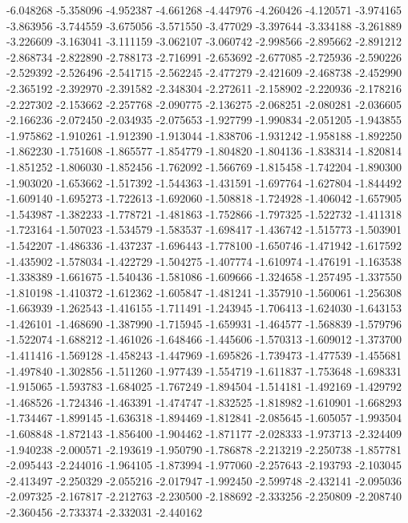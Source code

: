 -6.048268
-5.358096
-4.952387
-4.661268
-4.447976
-4.260426
-4.120571
-3.974165
-3.863956
-3.744559
-3.675056
-3.571550
-3.477029
-3.397644
-3.334188
-3.261889
-3.226609
-3.163041
-3.111159
-3.062107
-3.060742
-2.998566
-2.895662
-2.891212
-2.868734
-2.822890
-2.788173
-2.716991
-2.653692
-2.677085
-2.725936
-2.590226
-2.529392
-2.526496
-2.541715
-2.562245
-2.477279
-2.421609
-2.468738
-2.452990
-2.365192
-2.392970
-2.391582
-2.348304
-2.272611
-2.158902
-2.220936
-2.178216
-2.227302
-2.153662
-2.257768
-2.090775
-2.136275
-2.068251
-2.080281
-2.036605
-2.166236
-2.072450
-2.034935
-2.075653
-1.927799
-1.990834
-2.051205
-1.943855
-1.975862
-1.910261
-1.912390
-1.913044
-1.838706
-1.931242
-1.958188
-1.892250
-1.862230
-1.751608
-1.865577
-1.854779
-1.804820
-1.804136
-1.838314
-1.820814
-1.851252
-1.806030
-1.852456
-1.762092
-1.566769
-1.815458
-1.742204
-1.890300
-1.903020
-1.653662
-1.517392
-1.544363
-1.431591
-1.697764
-1.627804
-1.844492
-1.609140
-1.695273
-1.722613
-1.692060
-1.508818
-1.724928
-1.406042
-1.657905
-1.543987
-1.382233
-1.778721
-1.481863
-1.752866
-1.797325
-1.522732
-1.411318
-1.723164
-1.507023
-1.534579
-1.583537
-1.698417
-1.436742
-1.515773
-1.503901
-1.542207
-1.486336
-1.437237
-1.696443
-1.778100
-1.650746
-1.471942
-1.617592
-1.435902
-1.578034
-1.422729
-1.504275
-1.407774
-1.610974
-1.476191
-1.163538
-1.338389
-1.661675
-1.540436
-1.581086
-1.609666
-1.324658
-1.257495
-1.337550
-1.810198
-1.410372
-1.612362
-1.605847
-1.481241
-1.357910
-1.560061
-1.256308
-1.663939
-1.262543
-1.416155
-1.711491
-1.243945
-1.706413
-1.624030
-1.643153
-1.426101
-1.468690
-1.387990
-1.715945
-1.659931
-1.464577
-1.568839
-1.579796
-1.522074
-1.688212
-1.461026
-1.648466
-1.445606
-1.570313
-1.609012
-1.373700
-1.411416
-1.569128
-1.458243
-1.447969
-1.695826
-1.739473
-1.477539
-1.455681
-1.497840
-1.302856
-1.511260
-1.977439
-1.554719
-1.611837
-1.753648
-1.698331
-1.915065
-1.593783
-1.684025
-1.767249
-1.894504
-1.514181
-1.492169
-1.429792
-1.468526
-1.724346
-1.463391
-1.474747
-1.832525
-1.818982
-1.610901
-1.668293
-1.734467
-1.899145
-1.636318
-1.894469
-1.812841
-2.085645
-1.605057
-1.993504
-1.608848
-1.872143
-1.856400
-1.904462
-1.871177
-2.028333
-1.973713
-2.324409
-1.940238
-2.000571
-2.193619
-1.950790
-1.786878
-2.213219
-2.250738
-1.857781
-2.095443
-2.244016
-1.964105
-1.873994
-1.977060
-2.257643
-2.193793
-2.103045
-2.413497
-2.250329
-2.055216
-2.017947
-1.992450
-2.599748
-2.432141
-2.095036
-2.097325
-2.167817
-2.212763
-2.230500
-2.188692
-2.333256
-2.250809
-2.208740
-2.360456
-2.733374
-2.332031
-2.440162
